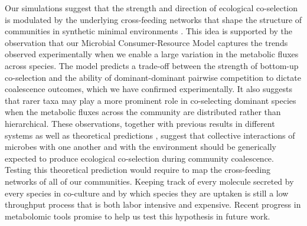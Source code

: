 \documentclass[a4paper,10pt]{article}
\begin{document}
Our simulations suggest that the strength and direction of ecological co-selection is modulated
by the underlying cross-feeding networks that shape the structure of
communities in synthetic minimal environments
\cite{Goldford2018,Estrela2020}.
This idea is supported by the observation that our Microbial Consumer-Resource Model
captures the trends observed experimentally when we enable a large variation
in the metabolic fluxes across species.
The model predicts a trade-off between the strength of bottom-up co-selection
and the ability of dominant-dominant pairwise competition to dictate coalescence outcomes,
which we have confirmed experimentally.
It also suggests that rarer taxa may play a more prominent role in co-selecting
dominant species when the metabolic fluxes across the community are
distributed rather than hierarchical.
These observations,
together with previous results in different systems \cite{Sierocinski2017} as well as
theoretical predictions
\cite{Gilpin1994,Toquenaga1997,Tikhonov2016,Tikhonov2017,Vila2019,Lechon2021},
suggest that collective interactions of microbes with one another
and with the environment should be generically expected to produce ecological co-selection
during community coalescence.
Testing this theoretical prediction would require to map the cross-feeding networks of all of our communities.
Keeping track of every molecule secreted by every species in co-culture and by which species they are uptaken
is still a low throughput process that is both labor intensive and expensive.
Recent progress in metabolomic tools promise to help us test this hypothesis in future work.

\end{document}
